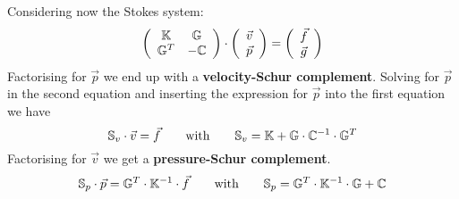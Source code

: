 Considering now the Stokes system: 
\[
\left( \begin{array}{cc}
{\mathbb{K}} & {\mathbb{G}}  \\ {\mathbb{G}}^T &  -{\mathbb{C}}
\end{array} \right) \cdot
\left( \begin{array}{c}  {\vec v} \\ {\vec p}  \end{array} \right) = 
\left( \begin{array}{c}  {\vec f} \\ {\vec g}  \end{array} \right) 
\]
Factorising for ${\vec p}$ we end up with a {\bf velocity-Schur complement}.
Solving for ${\vec p}$ in the second equation and inserting the expression
for ${\vec p}$ into the first equation we have
\[
\mathbb{S}_v \cdot {\vec v}  = {\vec f} 
\quad\quad
\text{with}
\quad\quad
\mathbb{S}_v={\mathbb{K}}+ {\mathbb{G}} \cdot {\mathbb{C}}^{-1} \cdot {\mathbb{G}}^T
\]
Factorising for $\vec v$ we get a {\bf pressure-Schur complement}.
\[
\mathbb{S}_p \cdot {\vec p}  = {\mathbb{G}}^T \cdot {\mathbb{K}}^{-1}\cdot {\vec f}
\quad\quad
\text{with}
\quad\quad
\mathbb{S}_p = {\mathbb{G}}^T \cdot {\mathbb{K}}^{-1}\cdot {\mathbb{G}} + {\mathbb{C}} 
\]


